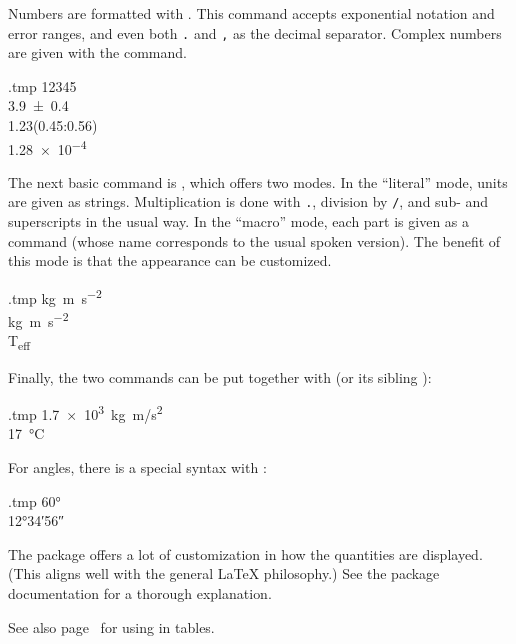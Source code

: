 Numbers are formatted with .
This command accepts exponential notation and error ranges,
and even both \verb|.| and \verb|,| as the decimal separator.
Complex numbers are given with the  command.
%
\begin{VerbatimOut}{\jobname.tmp}
\num{12345}\\
\num{3,9 +- 0,4}\\
\num{1.23(0.45:0.56)}\\
\num{1.28e-4}\\
\end{VerbatimOut}
\ShowExample

The next basic command is , which offers two modes.
In the ``literal'' mode, units are given as strings.
Multiplication is done with \verb|.|, division by \verb|/|,
and sub- and superscripts in the usual way.
In the ``macro'' mode, each part is given as a command
(whose name corresponds to the usual spoken version).
The benefit of this mode is that the appearance can be customized.
%
\begin{VerbatimOut}{\jobname.tmp}
\unit{kg.m.s^{-2}}\\
\unit{\kilogram\metre\per\second\squared}\\
\unit{T_{eff}}
\end{VerbatimOut}
\ShowExample

Finally, the two commands can be put together with  (or its sibling ):
%
\begin{VerbatimOut}{\jobname.tmp}
\qty{1.7e3}{kg.m/s^2}\\
\qty{17}{\degreeCelsius}\\
\end{VerbatimOut}
\ShowExample
%
For angles, there is a special syntax with :
%
\begin{VerbatimOut}{\jobname.tmp}
\ang{60}\\
\ang{12;34;56}
\end{VerbatimOut}
\ShowExample

The package offers a lot of customization in how the quantities are displayed.
(This aligns well with the general \LaTeX{} philosophy.)
See the package documentation for a thorough explanation.

\begin{remark}
See also page~\pageref{ex:table siunitx} for using  in tables.
\end{remark}




